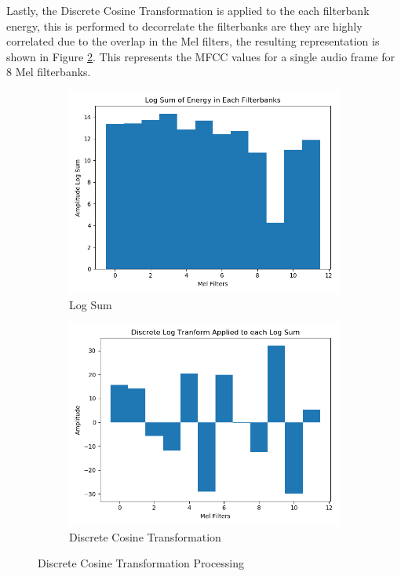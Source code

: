 Lastly, the Discrete Cosine Transformation is applied to the each filterbank energy, this is performed to decorrelate the filterbanks are they are highly correlated due to the overlap in the Mel filters, the resulting representation is shown in Figure \ref{fig:mfcc_dct}.
This represents the MFCC values for a single audio frame for 8 Mel filterbanks.

\begin{figure}[h!]
    \centering
    \begin{subfigure}[b]{0.49\textwidth}
        \includegraphics[width=\textwidth]{figures/mfcc/filterbank_log_sum.png}
        \caption{Log Sum}\label{fig:mfcc_log_sum}
    \end{subfigure}
    \begin{subfigure}[b]{0.49\textwidth}
        \includegraphics[width=\textwidth]{figures/mfcc/dct_applied.png}
        \caption{Discrete Cosine Transformation}\label{fig:mfcc_dct}
    \end{subfigure}
    \caption{Discrete Cosine Transformation Processing}\label{fig:mfcc_filterbank_processing}
\end{figure}


